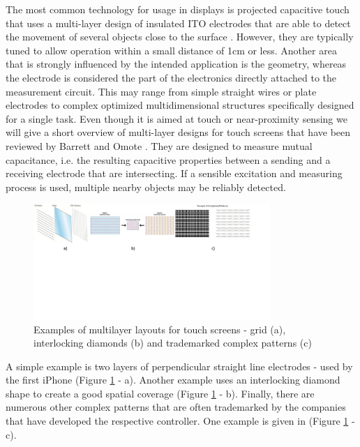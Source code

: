 The most common technology for usage in displays is projected capacitive touch that uses a multi-layer design of insulated ITO electrodes that are able to detect the movement of several objects close to the surface \cite{Barrett2010}. However, they are typically tuned to allow operation within a small distance of 1cm or less. 
Another area that is strongly influenced by the intended application is the geometry, whereas the electrode is considered the part of the electronics directly attached to the measurement circuit. This may range from simple straight wires or plate electrodes to complex optimized multidimensional structures specifically designed for a single task. Even though it is aimed at touch or near-proximity sensing we will give a short overview of  multi-layer designs for touch screens that have been reviewed by Barrett and Omote \cite{BarrettScreen}. They are designed to measure mutual capacitance, i.e. the resulting capacitive properties between a sending and a receiving electrode that are intersecting. If a sensible excitation and measuring process is used, multiple nearby objects may be reliably detected. 
\begin{figure} [h]
\centering
\includegraphics[width=0.8\textwidth]{images/ito_multilayer.png} 
\caption{Examples of multilayer layouts for touch screens - grid (a), interlocking diamonds (b) and  trademarked complex patterns (c) \cite{BarrettScreen}}
\label{fig:ito_multilayer}
\end{figure}
A simple example is two layers of perpendicular straight line electrodes - used by the first iPhone (Figure \ref{fig:ito_multilayer} - a). Another example uses an interlocking diamond shape \cite{Dietz2001a} to create a good spatial coverage (Figure \ref{fig:ito_multilayer} - b). Finally, there are numerous other complex patterns that are often trademarked by the companies that have developed the respective controller. One example is given in (Figure \ref{fig:ito_multilayer} - c). 

